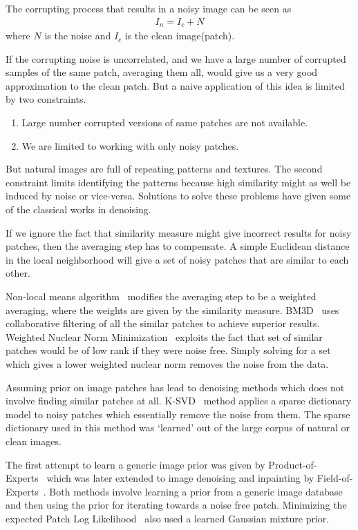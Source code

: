 \documentclass[10pt,twocolumn,letterpaper]{proc}
\begin{document}
The corrupting process that results in a noisy image can be seen as
\begin{align}
    I_n = I_c+N
\end{align}
where $N$ is the noise and $I_c$ is the clean image(patch).


If the corrupting noise is uncorrelated, and we have a large number of corrupted samples of the same patch, averaging them all, would give us a very good approximation to the clean patch. But a naive application of this idea is limited by two constraints.
\begin{enumerate}
    \item Large number corrupted versions of same patches are not available. 
    \item We are limited to working with only noisy patches. 
\end{enumerate}
But natural images are full of repeating patterns and textures. The second constraint limits identifying the patterns because high similarity might as well be induced by noise or vice-versa. Solutions to solve these problems have given some of the classical works in denoising.

If we ignore the fact that similarity measure might give incorrect results for noisy patches, then the averaging step has to compensate. A simple Euclidean distance in the local neighborhood will give a set of noisy patches that are similar to each other.

Non-local means algorithm~\cite{buades2005review} modifies the averaging step to be a weighted averaging, where the weights are given by the similarity measure. BM3D~\cite{dabov2009bm3d} uses collaborative filtering of all the similar patches to achieve superior results. Weighted Nuclear Norm Minimization~\cite{gu2014weighted} exploits the fact that set of similar patches would be of low rank if they were noise free. Simply solving for a set which gives a lower weighted nuclear norm removes the noise from the data. 



Assuming prior on image patches has lead to denoising methods which does not involve finding similar patches at all. K-SVD~\cite{elad2006image} method applies a sparse dictionary model to noisy patches which essentially remove the noise from them. The sparse dictionary used in this method was `learned' out of the large corpus of natural or clean images. 


The first attempt to learn a generic image prior was given by Product-of-Experts~\cite{hinton1999products} which was later extended to image denoising and inpainting by Field-of-Experts~\cite{roth2005fields}. Both methods involve learning a prior from a generic image database and then using the prior for iterating towards a noise free patch. Minimizing the expected Patch Log Likelihood~\cite{zoran2011learning} also used a learned Gaussian mixture prior.
\end{document}
